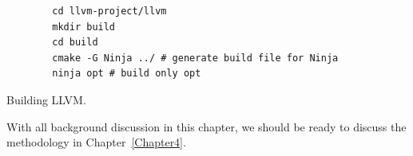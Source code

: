 \begin{listing}[htbp]
    \begin{verbatim}
        cd llvm-project/llvm
        mkdir build
        cd build
        cmake -G Ninja ../ # generate build file for Ninja
        ninja opt # build only opt
    \end{verbatim}
    \caption{Building LLVM.}    
    \label{listing:build-llvm}
\end{listing}

With all background discussion in this chapter, we should be ready to discuss
the methodology in Chapter~\ref{Chapter4}.